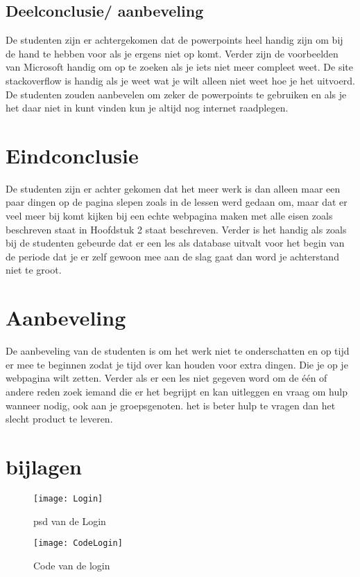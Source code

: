 \documentclass[11pt]{article}
\begin{document}
	\subsection{Deelconclusie/ aanbeveling}
	De studenten zijn er achtergekomen dat de powerpoints heel handig zijn om bij de hand te hebben voor als je ergens niet op komt. Verder zijn de voorbeelden van Microsoft handig om op te zoeken als je iets niet meer compleet weet. De site stackoverflow is handig als je weet wat je wilt alleen niet weet hoe je het uitvoerd. De studenten zouden aanbevelen om zeker de powerpoints te gebruiken en als je het daar niet in kunt vinden kun je altijd nog internet raadplegen. 
	\newpage
	
	\section{Eindconclusie}
	De studenten zijn er achter gekomen dat het meer werk is dan alleen maar een paar dingen op de pagina slepen zoals in de lessen werd gedaan om, maar dat er veel meer bij komt kijken bij een echte webpagina maken met alle eisen zoals beschreven staat in Hoofdstuk 2 staat beschreven. Verder is het handig als zoals bij de studenten gebeurde dat er een les als database uitvalt voor het begin van de periode dat je er zelf gewoon mee aan de slag gaat dan word je achterstand niet te groot.
	
	
	\section{Aanbeveling}
	De aanbeveling van de studenten is om het werk niet te onderschatten en op tijd er mee te beginnen zodat je tijd over kan houden voor extra dingen. Die je op je webpagina wilt zetten. Verder als er een les niet gegeven word om de één of andere reden zoek iemand die er het begrijpt en kan uitleggen en vraag om hulp wanneer nodig, ook aan je groepsgenoten. het is beter hulp te vragen dan het slecht product te leveren.  
	
	\newpage
	
	\section{bijlagen}
	
	\begin{figure}[h]
		\texttt{[image: Login]}
		\caption{psd van de Login}
		\label{Login}
	\end{figure}
	\newpage
	\begin{figure}[h]
		\texttt{[image: CodeLogin]}
		\caption{Code van de login}
		\label{LoginCode}
	\end{figure}
	\newpage
	
\end{document}
